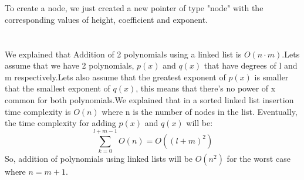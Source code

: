 \documentclass[journal,article,submit,moreauthors,algorithms]{Definitions/mdpi}
\begin{document}
\section[\appendixname~\thesection]{}
To create a node, we just created a new pointer of type "node" with the corresponding values of height, coefficient and exponent.

\section[\appendixname~\thesection]{}
We explained that Addition of 2 polynomials using a linked list is $O(n\cdot m)$.Lets assume that we have 2 polynomials, $p(x)$ and $q(x)$ that have degrees of l and m respectively.Lets also assume that the greatest exponent of $p(x)$ is smaller that the smallest exponent of $q(x)$, this means that there's no power of x common for both polynomials.We explained that in a sorted linked list insertion time complexity is $O(n)$ where n is the number of nodes in the list. Eventually, the time complexity for adding $p(x)$ and $q(x)$ will be:
\[\sum_{k=0}^{l+m-1} O(n) = O((l+m)^2)\] So, addition of polynomials using linked lists will be $O(n^2)$ for the worst case where $n = m + 1$.
\end{document}
